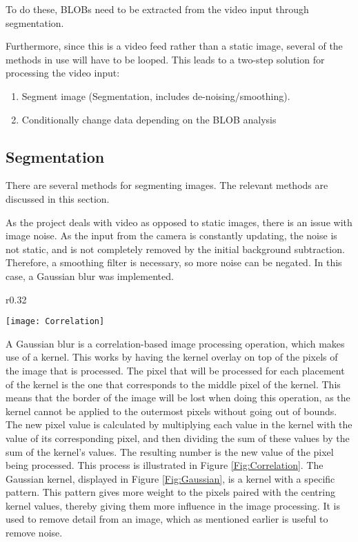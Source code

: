 To do these, BLOBs need to be extracted from the video input through segmentation.  

Furthermore, since this is a video feed rather than a static image, several of the methods in use will have to be looped. This leads to a two-step solution for processing the video input:

\begin{enumerate}
\item Segment image (Segmentation, includes de-noising/smoothing).
\item Conditionally change data depending on the BLOB analysis
\end{enumerate}


\subsection{Segmentation}
There are several methods for segmenting images. The relevant methods are discussed in this section. 

As the project deals with video as opposed to static images, there is an issue with image noise. As the input from the camera is constantly updating, the noise is not static, and is not completely removed by the initial background subtraction. Therefore, a smoothing filter is necessary, so more noise can be negated. In this case, a Gaussian blur was implemented.

\begin{wrapfigure}{r}{0.32\textwidth}
  \begin{center}
    \texttt{[image: Correlation]}
  \end{center}
  \caption{A visualisation of correlation \label{Fig:Correlation}\citep{moeslund_introduction_2012}}
\end{wrapfigure}

A Gaussian blur is a correlation-based image processing operation, which makes use of a kernel. This works by having the kernel overlay on top of the pixels of the image that is processed. The pixel that will be processed for each placement of the kernel is the one that corresponds to the middle pixel of the kernel. This means that the border of the image will be lost when doing this operation, as the kernel cannot be applied to the outermost pixels without going out of bounds. The new pixel value is calculated by multiplying each value in the kernel with the value of its corresponding pixel, and then dividing the sum of these values by the sum of the kernel's values. The resulting number is the new value of the pixel being processed.
This process is illustrated in Figure \ref{Fig:Correlation}. The Gaussian kernel, displayed in Figure \ref{Fig:Gaussian}, is a kernel with a specific pattern. This pattern gives more weight to the pixels paired with the centring kernel values, thereby giving them more influence in the image processing. It is used to remove detail from an image, which as mentioned earlier is useful to remove noise.

